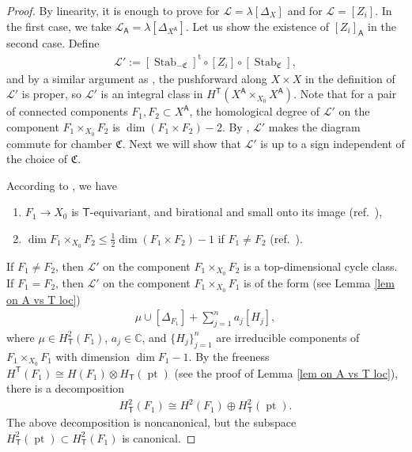 \documentclass[10pt]{amsart}
\theoremstyle{definition}
\numberwithin{equation}{section}
\newcommand{\bC}{\mathbb{C}}
\newcommand{\fC}{\mathfrak{C}}
\newcommand{\sA}{\mathsf{A}}
\newcommand{\sT}{\mathsf{T}}
\newcommand{\pt}{\operatorname{pt}}
\newcommand{\Stab}{\operatorname{Stab}}
\begin{document}
\begin{proof}
By linearity, it is enough to prove for $\mathcal L=\lambda[\Delta_X]$ and for $\mathcal L=[Z_i]$. In the first case, we take $\mathcal L_\sA=\lambda[\Delta_{X^\sA}]$. Let us show the existence of $[Z_i]_\sA$ in the second case. Define 
\begin{align*}
    \mathcal L':=[\Stab_{-\fC}]^{\mathrm{t}}\circ [Z_i]\circ [\Stab_{\fC}],
\end{align*}
and by a similar argument as \cite[Thm.~4.6.1]{MO}, the pushforward along $X\times X$ in the definition of $\mathcal L'$ is proper, so $ \mathcal L'$ is an integral class in $H^{\sT}(X^\sA\times_{X_0} X^\sA)$. Note that for a pair of connected components $F_1,F_2\subset X^\sA$, the homological degree of $\mathcal L'$ on the component $F_1\times_{X_0} F_2$ is $\dim(F_1\times F_2)-2$. By \cite[Lem.~3.29]{COZZ}, $\mathcal L'$ makes the diagram commute for chamber $\fC$.
Next we will show that $\mathcal L'$ is up to a sign independent of the choice of $\fC$.


According to \cite{COZZ3}, we have
\begin{enumerate}
    \item $F_1\to X_0$ is $\sT$-equivariant, and birational and small onto its image (ref.~\cite[Prop.~3.21]{COZZ3}),
    \item $\dim F_1\times_{X_0} F_2\leqslant \frac{1}{2}\dim (F_1\times F_2)-1$ if $F_1\neq F_2$ (ref.~\cite[Rmk.~3.24]{COZZ3}).
\end{enumerate}
If $F_1\neq F_2$, then $\mathcal L'$ on the component $F_1\times_{X_0} F_2$ is a top-dimensional cycle class. If $F_1=F_2$, then $\mathcal L'$ on the component $F_1\times_{X_0} F_1$ is of the form (see Lemma \ref{lem on A vs T loc})
\begin{align*}
\mu\cup[\Delta_{F_1}]+\sum_{j=1}^n a_j[H_j],
\end{align*}
where $\mu\in H_{\sT}^2(F_1)$, $a_j\in \bC$, and $\{H_j\}_{j=1}^n$ are irreducible components of $F_1\times_{X_0} F_1$ with dimension $\dim F_1-1$. 
By the freeness $H^\sT(F_1)\cong H(F_1)\otimes H_{\sT}(\pt)$ (see the proof of Lemma \ref{lem on A vs T loc}), there is a decomposition
\begin{align*}
H_{\sT}^2(F_1)\cong H^2(F_1)\oplus H^2_{\sT}(\pt).
\end{align*}
The above decomposition is noncanonical, but the subspace $H^2_{\sT}(\pt)\subset H_{\sT}^2(F_1)$ is canonical. 


\end{proof}
\end{document}
